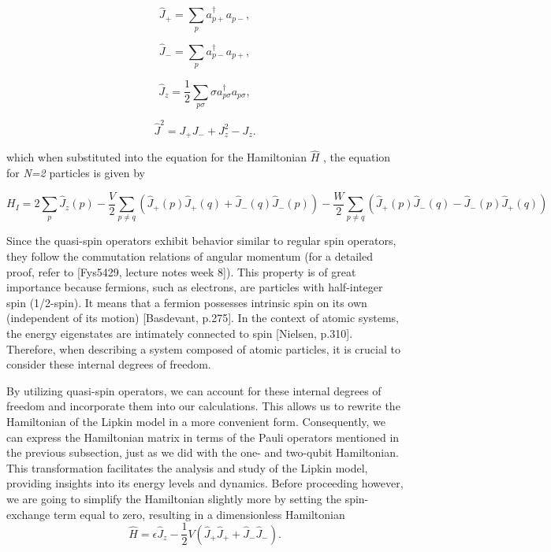 \documentclass[onecolumn,10pt,cleanfoot]{asme2ej}
\begin{document}
\begin{equation}
\hat{J}_{+} = \sum_{p} a_{p+}^{\dagger}a_{p-},
\end{equation}

\begin{equation}
\hat{J}_{-} = \sum_{p} a_{p-}^{\dagger}a_{p+},
\end{equation}

\begin{equation}
\hat{J}_{z} = \frac{1}{2}\sum_{p\sigma} \sigma a_{p\sigma}^{\dagger}a_{p\sigma}, 
\end{equation}

\begin{equation}
\hat{J}^{2} = J_{+}J_{-} + J_{z}^{2} - J_{z}.
\end{equation}

which when substituted into the equation for the Hamiltonian $\hat{H}$ , the equation for \textit{N=2} particles is given by

\begin{equation}
	H_I = 2\sum_{p}\hat{J}_z(p) - \frac{V}{2}\sum_{p \neq q}(\hat{J}_+(p)\hat{J}_+(q) + \hat{J}_-(q)\hat{J}_-(p)) - \frac{W}{2}\sum_{p \neq q}(\hat{J}_+(p)\hat{J}_-(q) - \hat{J}_-(p)\hat{J}_+(q))
\end{equation}

Since the quasi-spin operators exhibit behavior similar to regular spin operators, they follow the commutation relations of angular momentum (for a detailed proof, refer to [Fys5429, lecture notes week 8]). This property is of great importance because fermions, such as electrons, are particles with half-integer spin (1/2-spin). It means that a fermion possesses intrinsic spin on its own (independent of its motion) [Basdevant, p.275]. In the context of atomic systems, the energy eigenstates are intimately connected to spin [Nielsen, p.310]. Therefore, when describing a system composed of atomic particles, it is crucial to consider these internal degrees of freedom.

By utilizing quasi-spin operators, we can account for these internal degrees of freedom and incorporate them into our calculations. This allows us to rewrite the Hamiltonian of the Lipkin model in a more convenient form. Consequently, we can express the Hamiltonian matrix in terms of the Pauli operators mentioned in the previous subsection, just as we did with the one- and two-qubit Hamiltonian. This transformation facilitates the analysis and study of the Lipkin model, providing insights into its energy levels and dynamics. Before proceeding however, we are going to simplify the Hamiltonian slightly more by setting the spin-exchange term equal to zero, resulting in a dimensionless Hamiltonian
\begin{equation}
\hat{H} = \epsilon\hat{J}_z - \frac{1}{2}V(\hat{J}_+\hat{J}_+ + \hat{J}_-\hat{J}_-).
\end{equation}
\end{document}
